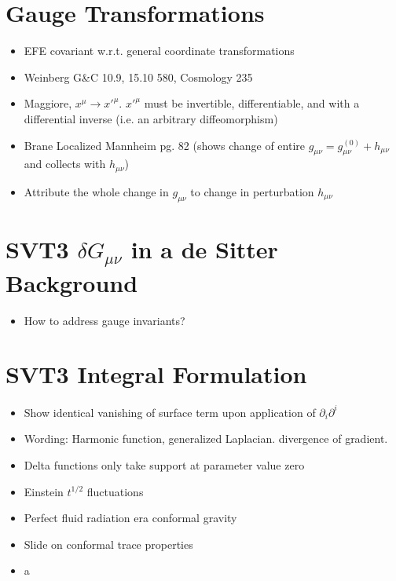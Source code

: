\documentclass[10pt,letterpaper]{article}
\numberwithin{equation}{section}
\begin{document}
\section*{Gauge Transformations}
\begin{itemize}	
	\item EFE covariant w.r.t. general coordinate transformations
	\item Weinberg G\&C 10.9, 15.10 580, Cosmology 235
	\item Maggiore, $x^\mu \to x'^\mu$. $x'^\mu$ must be invertible, differentiable, and with a differential inverse (i.e. an arbitrary diffeomorphism)
	\item Brane Localized Mannheim pg. 82 (shows change of entire $g_{\mu\nu} = g_{\mu\nu}^{(0)}+h_{\mu\nu}$ and collects with $h_{\mu\nu}$)
	\item Attribute the whole change in $g_{\mu\nu}$ to change in perturbation $h_{\mu\nu}$
\end{itemize}

\section*{SVT3 $\delta G_{\mu\nu}$ in a de Sitter Background}
\begin{itemize}
	\item How to address gauge invariants?
\end{itemize}

\section*{SVT3 Integral Formulation}
\begin{itemize}
	\item Show identical vanishing of surface term upon application of $\partial_i \partial^i$
	\item Wording: Harmonic function, generalized  Laplacian. divergence of gradient. 
	\item Delta functions only take support at parameter value zero
	\item Einstein $t^{1/2}$ fluctuations
	\item Perfect fluid radiation era conformal gravity
	\item Slide on conformal trace properties
	\item a
\end{itemize}
\end{document}
